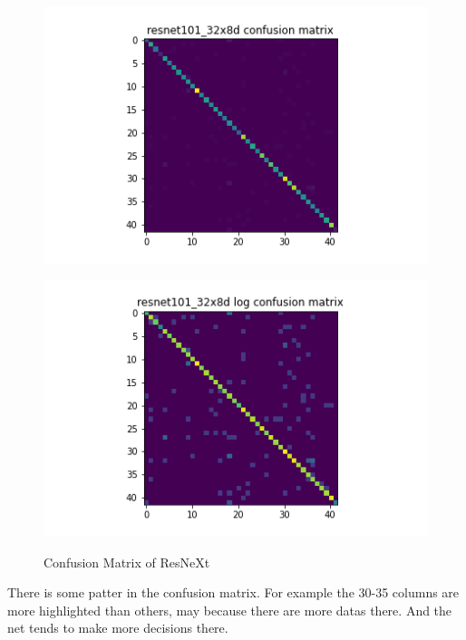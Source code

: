 \begin{figure}[H]
  \begin{minipage}[b]{.5\linewidth}
    \centering
    {\includegraphics[width=1.2\textwidth]{figs/resnext_conf1.png}}
  \end{minipage}
  \hfill
  \begin{minipage}[b]{.5\linewidth}
    \centering

    {\includegraphics[width=1.2\textwidth]{figs/resnext_conf2.png}}
  \end{minipage}

  \caption{Confusion Matrix of ResNeXt}
  \label{fig:resnext}
  \vspace{0.2in}
\end{figure}

There is some patter in the confusion matrix. For example the 30-35 columns are more highlighted than others, may because there are more datas there. And the net tends to make more decisions there.

